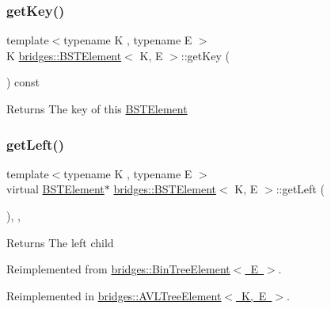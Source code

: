 \subsubsection{\texorpdfstring{get\+Key()}{getKey()}}
{\footnotesize\ttfamily template$<$typename K , typename E $>$ \\
K \mbox{\hyperlink{classbridges_1_1_b_s_t_element}{bridges\+::\+B\+S\+T\+Element}}$<$ K, E $>$\+::get\+Key (\begin{DoxyParamCaption}{ }\end{DoxyParamCaption}) const\hspace{0.3cm}{\ttfamily [inline]}}

\begin{DoxyReturn}{Returns}
The key of this \mbox{\hyperlink{classbridges_1_1_b_s_t_element}{B\+S\+T\+Element}} 
\end{DoxyReturn}
\mbox{\label{classbridges_1_1_b_s_t_element_a4d8987373c75b51fca94e3c0b78b87a6}} 
\subsubsection{\texorpdfstring{get\+Left()}{getLeft()}\hspace{0.1cm}{\footnotesize\ttfamily [1/2]}}
{\footnotesize\ttfamily template$<$typename K , typename E $>$ \\
virtual \mbox{\hyperlink{classbridges_1_1_b_s_t_element}{B\+S\+T\+Element}}$\ast$ \mbox{\hyperlink{classbridges_1_1_b_s_t_element}{bridges\+::\+B\+S\+T\+Element}}$<$ K, E $>$\+::get\+Left (\begin{DoxyParamCaption}{ }\end{DoxyParamCaption})\hspace{0.3cm}{\ttfamily [inline]}, {\ttfamily [override]}, {\ttfamily [virtual]}}

\begin{DoxyReturn}{Returns}
The left child 
\end{DoxyReturn}


Reimplemented from \mbox{\hyperlink{classbridges_1_1_bin_tree_element_a8367ce9c4eea814637edc2c56efbde25}{bridges\+::\+Bin\+Tree\+Element$<$ E $>$}}.



Reimplemented in \mbox{\hyperlink{classbridges_1_1_a_v_l_tree_element_a7b5d05660da127f5f6164120d9846d90}{bridges\+::\+A\+V\+L\+Tree\+Element$<$ K, E $>$}}.

